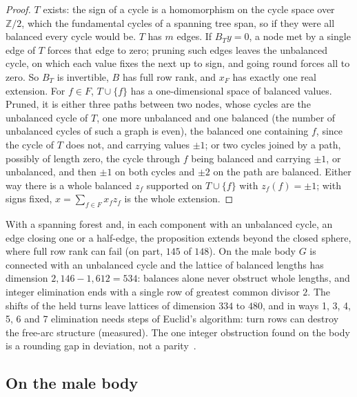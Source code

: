\documentclass[11pt,a4paper]{article}
\newcommand{\Z}{\mathbb{Z}}
\begin{document}
\begin{proof}
$T$ exists: the sign of a cycle is a homomorphism on the cycle space over
$\Z/2$, which the fundamental cycles of a spanning tree span, so if they were
all balanced every cycle would be. $T$ has $m$ edges. If $B_T y = 0$, a node
met by a single edge of $T$ forces that edge to zero; pruning such edges
leaves the unbalanced cycle, on which each value fixes the next up to sign,
and going round forces all to zero. So $B_T$ is invertible, $B$ has full row
rank, and $x_F$ has exactly one real extension. For $f \in F$, $T \cup \{f\}$
has a one-dimensional space of balanced values. Pruned, it is either three
paths between two nodes, whose cycles are the unbalanced cycle of $T$, one more
unbalanced and one balanced (the number of unbalanced cycles of such a graph
is even), the balanced one containing $f$, since the cycle of $T$ does not,
and carrying values $\pm1$; or two cycles joined by a path, possibly of length
zero, the cycle through $f$ being balanced and carrying $\pm1$, or unbalanced,
and then $\pm1$ on both cycles and $\pm2$ on the path are balanced. Either way
there is a whole balanced $z_f$ supported on $T \cup \{f\}$ with $z_f(f) =
\pm1$; with signs fixed, $x = \sum_{f \in F} x_f z_f$ is the whole extension.
\end{proof}

With a spanning forest and, in each component with an unbalanced cycle, an
edge closing one or a half-edge, the proposition extends beyond the closed
sphere, where full row rank can fail (on part, $145$ of $148$). On the male
body $G$ is connected with an unbalanced cycle and the lattice of balanced
lengths has dimension $2{,}146 - 1{,}612 = 534$: balances alone never obstruct
whole lengths, and integer elimination ends with a single row of greatest
common divisor $2$. The shifts of the held turns leave lattices of dimension
$334$ to $480$, and in ways 1, 3, 4, 5, 6 and 7 elimination needs steps of
Euclid's algorithm: turn rows can destroy the free-arc structure (measured).
The one integer obstruction found on the body is a rounding gap in deviation,
not a parity~\cite[\S7]{gardent2026loops}. %

\subsection{On the male body}
\end{document}
